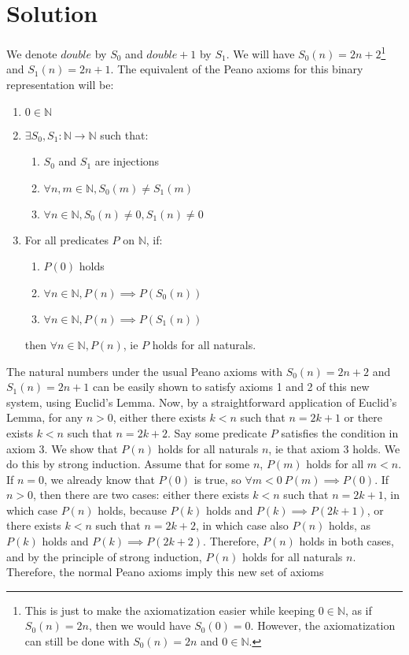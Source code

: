 \documentclass[12pt]{report}
\begin{document}
\section*{Solution}
We denote $double$ by $S_{0}$ and $double + 1$ by $S_{1}$. We will have $S_{0}(n) = 2n + 2$\footnote{This is just to make the axiomatization easier while keeping $0 \in \mathbb{N}$, as if $S_{0}(n) = 2n$, then we would have $S_{0}(0) = 0$. However, the axiomatization can still be done with $S_{0}(n) = 2n$ and $0 \in \mathbb{N}$.} and $S_{1}(n) = 2n + 1$. The equivalent of the Peano axioms for this binary representation will be:
\begin{enumerate}
  \item $0 \in \mathbb{N}$
  \item $\exists S_{0}, S_{1}: \mathbb{N} \rightarrow \mathbb{N}$ such that:\begin{enumerate}
    \item $S_{0}$ and $S_{1}$ are injections
    \item $\forall n, m \in \mathbb{N}, S_{0}(m) \neq S_{1}(m)$
    \item $\forall n \in \mathbb{N}, S_{0}(n) \neq 0, S_{1}(n) \neq 0$
  \end{enumerate}
  \item For all predicates $P$ on $\mathbb{N}$, if:\begin{enumerate}
    \item $P(0)$ holds
    \item $\forall n \in \mathbb{N}, P(n) \implies P(S_{0}(n))$
    \item $\forall n \in \mathbb{N}, P(n) \implies P(S_{1}(n))$
  \end{enumerate}
  then $\forall n \in \mathbb{N}, P(n)$, ie $P$ holds for all naturals.
\end{enumerate}
The natural numbers under the usual Peano axioms with $S_{0}(n) = 2n + 2$ and $S_{1}(n) = 2n + 1$ can be easily shown to satisfy axioms 1 and 2 of this new system, using Euclid's Lemma. Now, by a straightforward application of Euclid's Lemma, for any $n > 0$, either there exists $k < n$ such that $n = 2k + 1$ or there exists $k < n$ such that $n = 2k + 2$. Say some predicate $P$ satisfies the condition in axiom 3. We show that $P(n)$ holds for all naturals $n$, ie that axiom 3 holds. We do this by strong induction. Assume that for some $n$, $P(m)$ holds for all $m < n$. If $n = 0$, we already know that $P(0)$ is true, so $\forall m < 0\ P(m) \implies P(0)$. If $n > 0$, then there are two cases: either there exists $k < n$ such that $n = 2k + 1$, in which case $P(n)$ holds, because $P(k)$ holds and $P(k) \implies P(2k + 1)$, or there exists $k < n$ such that $n = 2k + 2$, in which case also $P(n)$ holds, as $P(k)$ holds and $P(k) \implies P(2k + 2)$. Therefore, $P(n)$ holds in both cases, and by the principle of strong induction, $P(n)$ holds for all naturals $n$. Therefore, the normal Peano axioms imply this new set of axioms
\end{document}
